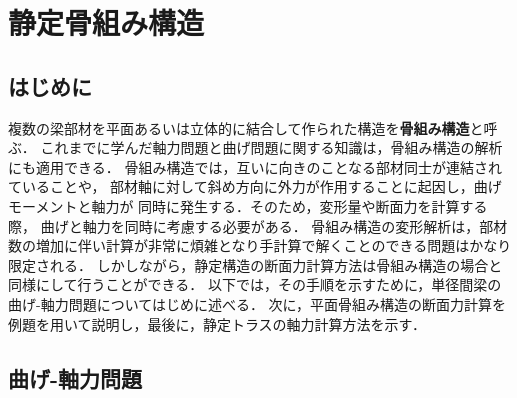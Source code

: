 ﻿\documentclass[10pt,a4j]{jbook}
\newlength{\minitwocolumn}
\begin{document}
\newcommand{\fat}[1]{\mbox{\boldmath $#1$}}
\newcommand{\D}{\partial}
\newcommand{\w}{\omega}
\newcommand{\ga}{\alpha}
\newcommand{\gb}{\beta}
\newcommand{\gx}{\xi}
\newcommand{\gz}{\zeta}
\newcommand{\vhat}[1]{\hat{\fat{#1}}}
\newcommand{\spc}{\vspace{0.7\baselineskip}}
\newcommand{\halfspc}{\vspace{0.3\baselineskip}}

\newcommand{\twofig}[2]
 {
   \begin{figure}
     \begin{minipage}[t]{\minitwocolumn}
         \begin{center}   #1
         \end{center}
     \end{minipage}
         \hspace{\columnsep}
     \begin{minipage}[t]{\minitwocolumn}
         \begin{center} #2
         \end{center}
     \end{minipage}
   \end{figure}
 }
\setcounter{chapter}{8}
\chapter{静定骨組み構造}
\section{はじめに}
複数の梁部材を平面あるいは立体的に結合して作られた構造を{\bf 骨組み構造}と呼ぶ．
これまでに学んだ軸力問題と曲げ問題に関する知識は，骨組み構造の解析にも適用できる．
骨組み構造では，互いに向きのことなる部材同士が連結されていることや，
部材軸に対して斜め方向に外力が作用することに起因し，曲げモーメントと軸力が
同時に発生する．そのため，変形量や断面力を計算する際， 曲げと軸力を同時に考慮する必要がある．
骨組み構造の変形解析は，部材数の増加に伴い計算が非常に煩雑となり手計算で解くことのできる問題はかなり限定される．
しかしながら，静定構造の断面力計算方法は骨組み構造の場合と同様にして行うことができる．
以下では，その手順を示すために，単径間梁の曲げ-軸力問題についてはじめに述べる．
次に，平面骨組み構造の断面力計算を例題を用いて説明し，最後に，静定トラスの軸力計算方法を示す．
\section{曲げ-軸力問題}
\end{document}
